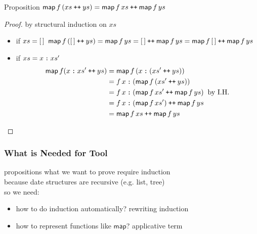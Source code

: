 \documentclass[12pt,aspectratio=169]{beamer}
\newcommand{\m}[1]{\mathsf{#1}}
\newcommand\catenate{\mathbin{\text{\ttfamily\upshape ++}}}
\newcommand\cons{\mathbin{\text{\ttfamily\upshape :}}}
\begin{document}
\begin{frame}
    \begin{block}{Proposition}
        $\m{map}\,f\,(xs \catenate ys) = \m{map} \, f \, xs \catenate \m{map}\,f\,ys$
    \end{block}
    \begin{proof}
        by structural induction on $xs$
        \begin{itemize}
            \item if $xs = [\,]$ $\m{map}\,f\,(\nil \catenate ys) = \m{map}\, f \,ys
                = \nil \catenate \m{map}\,f\,ys = \m{map}\,f\,\nil \catenate \m{map}\,f\,ys$
            \item if $xs = x \cons xs'$
            \setlength{\abovedisplayskip}{1pt}
            \setlength{\belowdisplayskip}{-1pt}
                \begin{align*}
                    \m{map}\,f(x\cons xs' \catenate ys) &= \m{map}\,f\,(x \cons (xs' \catenate ys))\\
                    &= f\,x \cons (\m{map}\,f\,(xs' \catenate ys))\\
                    &= f\,x \cons (\m{map}\,f\,xs' \catenate \m{map}\,f\,ys) \;\;\text{by I.H.}\\
                    &= f\,x \cons (\m{map}\,f\,xs') \catenate \m{map}\,f\,ys\\
                    &= \m{map}\,f\,xs \catenate \m{map}\,f\,ys
                \end{align*}
        \end{itemize}
        \vspace{-6pt}
    \end{proof}
\end{frame}

\begin{frame}
    \frametitle{What is Needed for Tool}
    propositions what we want to prove require \alert{induction}\\
    because date structures are \alert{recursive} (e.g. list, tree)\\
    so we need:
    \begin{figure}
        \centering
    \end{figure}
    \begin{itemize}
        \item how to do induction automatically? \quad \alert{rewriting induction}\\
        \item how to represent functions like $\m{map}$? \quad \alert{applicative term}
    \end{itemize}
\end{frame}
\end{document}
